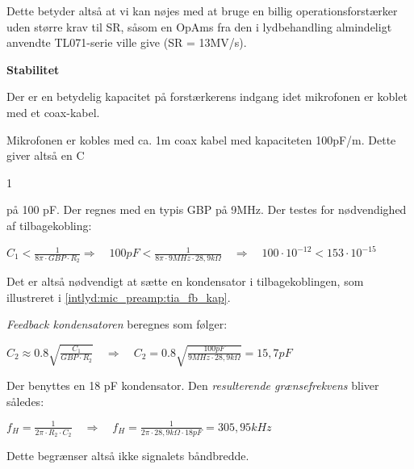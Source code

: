 Dette betyder altså at vi kan nøjes med at bruge en billig operationsforstærker uden større krav til SR, såsom en OpAms fra den i lydbehandling almindeligt anvendte TL071-serie ville give (SR = 13MV/s).

\textbf{Stabilitet}

Der er en betydelig kapacitet på forstærkerens indgang idet mikrofonen er koblet med et coax-kabel.
\begin{center}
\end{center}
Mikrofonen er kobles med ca. 1m coax kabel med kapaciteten 100pF/m. Dette giver altså en C\begin{tiny}1\end{tiny} på 100 pF.
Der regnes med en typis GBP på 9MHz. Der testes for nødvendighed af tilbagekobling:
\begin{center}
${ C }_{ 1 }<\frac { 1 }{ 8\pi \cdot GBP\cdot { R }_{ 2 } } \Longrightarrow \quad 100pF<\frac { 1 }{ 8\pi \cdot 9MHz\cdot 28,9k\Omega  } \quad \Longrightarrow \quad 100\cdot { 10 }^{ -12 }<153\cdot { 10 }^{ -15 }$
\end{center}
Det er altså nødvendigt at sætte en kondensator i tilbagekoblingen, som illustreret i \ref{intlyd:mic_preamp:tia_fb_kap}.
\begin{center}
\end{center}

\textit{Feedback kondensatoren} beregnes som følger:
\begin{center}
${ C }_{ 2 }\approx 0.8\sqrt { \frac { { C }_{ 1 } }{ GBP\cdot { R }_{ 2 } }  } \quad \Longrightarrow \quad { C }_{ 2 }=0.8\sqrt { \frac { 100pF }{ 9MHz\cdot 28,9k\Omega  }  } =15,7pF\quad$
\end{center}

Der benyttes en 18 pF kondensator. Den \textit{resulterende grænsefrekvens} bliver således:
\begin{center}
${ f }_{ H }=\frac { 1 }{ 2\pi \cdot { R }_{ 2 }\cdot { C }_{ 2 } } \quad \Longrightarrow \quad { f }_{ H }=\frac { 1 }{ 2\pi \cdot 28,9k\Omega \cdot 18pF } =305,95kHz$
\end{center}

Dette begrænser altså ikke signalets båndbredde.



